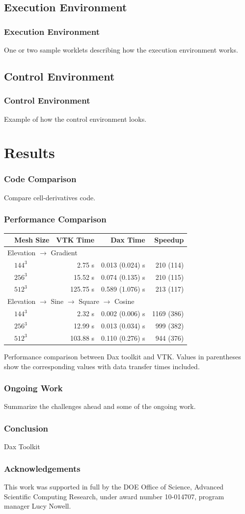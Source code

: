\documentclass[brown]{beamer}
\begin{document}
\subsection{Execution Environment}
\frame
{
  \frametitle{Execution Environment}
  One or two sample worklets describing how the execution environment works.
}

\subsection{Control Environment}
\frame
{
  \frametitle{Control Environment}
  Example of how the control environment looks.
}

\section{Results}

\frame
{
  \frametitle{Code Comparison}
  Compare cell-derivatives code.
}

\frame
{
  \frametitle{Performance Comparison}
  \begin{table}[htbp]
    \centering
    \label{tab:Results}
    \begin{tabular}{llrrr}
      \qquad & Mesh Size & VTK Time & Dax Time & Speedup \\
      \hline
      \multicolumn{5}{l}{Elevation $\rightarrow$ Gradient} \\
      & $144^3$ & 2.75 s & 0.013 (0.024) s & 210 (114) \\
      & $256^3$ &  15.52 s & 0.074 (0.135) s & 210 (115) \\
      & $512^3$ &  125.75 s & 0.589 (1.076) s &  213 (117) \\
      \multicolumn{5}{l}{Elevation $\rightarrow$ Sine $\rightarrow$ Square $\rightarrow$ Cosine} \\
      & $144^3$ & 2.32 s & 0.002 (0.006) s &  1169 (386) \\
      & $256^3$ &  12.99 s & 0.013 (0.034) s & 999 (382) \\
      & $512^3$ & 103.88 s & 0.110 (0.276) s &  944 (376) \\
    \end{tabular} 
  \end{table}
  {Performance comparison between Dax toolkit and VTK. Values in
  parentheses show the corresponding values with data transfer times
  included}.
}

\frame
{
  \frametitle{Ongoing Work}
  Summarize the challenges ahead and some of the ongoing work.
}

\frame
{
  \frametitle{Conclusion}
  Dax Toolkit
}

\frame
{
  \frametitle{Acknowledgements}
  This work was supported in full by the DOE Office of Science, Advanced
  Scientific Computing Research, under award number 10-014707, program manager
  Lucy Nowell.
}
\end{document}
